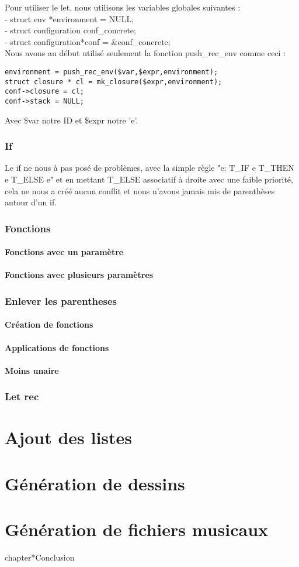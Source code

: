 \documentclass{report}
\begin{document}
Pour utiliser le let, nous utilisons les variables globales suivantes :\\
- struct env *environment = NULL;\\
- struct configuration conf\_concrete;\\
- struct configuration*conf = \&conf\_concrete;\\
Nous avons au début utilisé seulement la fonction push\_rec\_env comme ceci :
\begin{verbatim}
environment = push_rec_env($var,$expr,environment);
struct closure * cl = mk_closure($expr,environment);
conf->closure = cl;
conf->stack = NULL;
\end{verbatim}
Avec \$var notre ID et \$expr notre 'e'.


\section{If}

Le if ne nous à pas posé de problèmes, avec la simple règle "e: T\_IF e T\_THEN e T\_ELSE e" et en mettant T\_ELSE associatif à droite avec une faible priorité, cela ne nous a créé aucun conflit et nous n'avons jamais mis de parenthèses autour d'un if.

\section{Fonctions}
\subsection{Fonctions avec un paramètre}


\subsection{Fonctions avec plusieurs paramètres}


\section{Enlever les parentheses}
\subsection{Création de fonctions}
\subsection{Applications de fonctions}
\subsection{Moins unaire}

\section{Let rec}

\part{Ajout des listes}
\part{Génération de dessins}
\part{Génération de fichiers musicaux}

chapter*{Conclusion}
\end{document}
